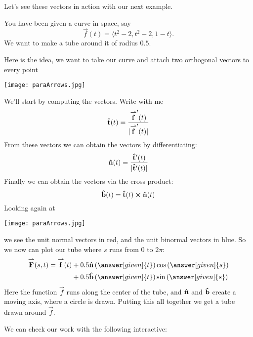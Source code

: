 \documentclass{ximera}
\begin{document}
Let's see these vectors in action with our next example.

\begin{example}
  You have been given a curve in space, say
  \[
  \vec{f}(t) = \langle t^2-2, t^2-2, 1-t\rangle.
  \]
  We want to make a tube around it of radius $0.5$.
  \begin{explanation}
    Here is the idea, we want to take our curve and attach two
    orthogonal vectors to every point
    \begin{image}
      \texttt{[image: paraArrows.jpg]}
    \end{image}
    We'll start by computing the
    vectors. Write with me
    \[
    \mathbf{\hat{t}}(t) = \frac{{\overset{\boldsymbol{\rightharpoonup}}{\mathbf{f}}}'(t)}{|{\overset{\boldsymbol{\rightharpoonup}}{\mathbf{f}}}'(t)|}
    \]
    From these vectors we can obtain the 
    vectors by differentiating:
    \[
    \mathbf{\hat{n}}(t) = \frac{\mathbf{\hat{t}}'(t)}{|\mathbf{\hat{t}}'(t)|}
    \]
    Finally we can obtain the 
    vectors via the cross product:
    \[
    \mathbf{\hat{b}}(t) = \mathbf{\hat{t}}(t) \boldsymbol\times \mathbf{\hat{n}}(t)
    \]
    Looking again at
    \begin{image}
      \texttt{[image: paraArrows.jpg]}
    \end{image}
    we see the unit normal vectors in red, and the unit binormal
    vectors in blue. So we now can plot our tube where $s$ runs from
    $0$ to $2\pi$:
    \begin{align*}
      \vec{F}(s,t) = \vec{f}(t) &+ 0.5 \unormal\left(\answer[given]{t}\right)\cos\left(\answer[given]{s}\right)\\
      &+ 0.5 \ubinormal\left(\answer[given]{t}\right)\sin\left(\answer[given]{s}\right)
    \end{align*}
    Here the function $\vec{f}$ runs along the center of the tube, and
    $\mathbf{\hat{n}}$ and $\mathbf{\hat{b}}$ create a moving axis, where a circle is
    drawn. Putting this all together we get a tube drawn around
    $\vec{f}$.
    \begin{onlineOnly}
      We can check our work with the following interactive:
      \begin{center}
      \end{center}
    \end{onlineOnly}
  \end{explanation}
\end{example}
\end{document}
